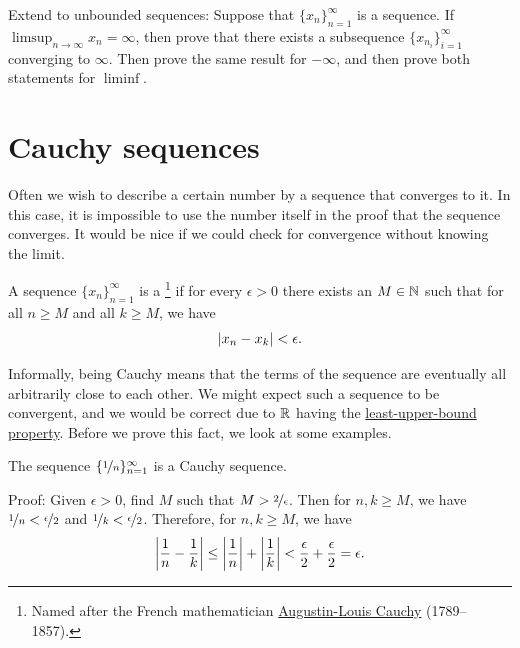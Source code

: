 \begin{exercise} \label{exercise:extendsubseqlimsupinf}
Extend  to unbounded sequences:
Suppose that $\{ x_n \}_{n=1}^\infty$ is a sequence.
If $\limsup_{n\to\infty} x_n = \infty$, then prove that
there exists a subsequence $\{ x_{n_i} \}_{i=1}^\infty$ converging to $\infty$.
Then prove the same result for $-\infty$, and then prove both statements for
$\liminf$.
\end{exercise}



\sectionnewpage
\section{Cauchy sequences}
\label{sec:cauchy}


Often we wish to describe a certain number 
by a sequence that converges to it.  In this case, it is impossible to use the
number itself in the proof that the sequence converges.
It would be nice if we could check for convergence without knowing
the limit.

\begin{defn}
A sequence $\{ x_n \}_{n=1}^\infty$ is a \emph{}%
\footnote{%
Named after the French mathematician
\href{https://en.wikipedia.org/wiki/Cauchy}{Augustin-Louis Cauchy} (1789--1857).} if
for every $\epsilon > 0$ there exists an $M \in {\mathbb{N}}$ such that
for all $n \geq M$ and all $k \geq M$, we have
\begin{equation*}
\lvert {x_n - x_k} \rvert < \epsilon .
\end{equation*}
\end{defn}

Informally, being Cauchy means that the terms of the sequence are eventually
all arbitrarily close to each other.  We might expect such a sequence to be
convergent, and we would be correct due to ${\mathbb{R}}$ having the
\hyperref[defn:lub]{least-upper-bound property}.  Before we prove this fact,
we look at some examples.

\begin{example}
The sequence $\{ \nicefrac{1}{n} \}_{n=1}^\infty$ is a Cauchy sequence.

Proof:  Given $\epsilon > 0$, find $M$ such that
$M > \nicefrac{2}{\epsilon}$.  Then for $n,k \geq M$,
we have $\nicefrac{1}{n} < \nicefrac{\epsilon}{2}$
and
$\nicefrac{1}{k} < \nicefrac{\epsilon}{2}$.  Therefore, for $n, k \geq M$,
we have
\begin{equation*}
\left\lvert {\frac{1}{n} - \frac{1}{k}} \right\rvert
\leq
\left\lvert {\frac{1}{n}} \right\rvert + \left\lvert {\frac{1}{k}} \right\rvert
< \frac{\epsilon}{2} + \frac{\epsilon}{2} = \epsilon.
\end{equation*}
\end{example}

